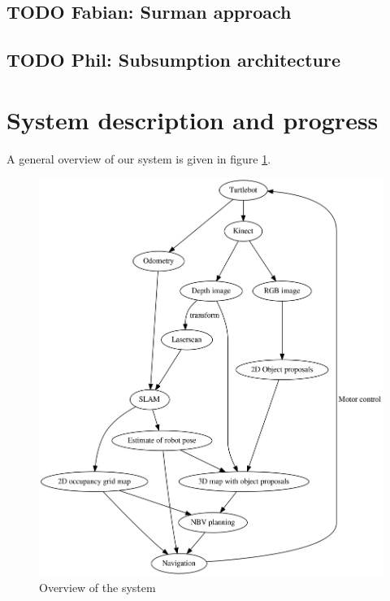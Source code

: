 \documentclass[a4paper,11pt,english]{article}
\begin{document}
\subsection{TODO Fabian: Surman approach}
\label{background:surman}
\subsection{TODO Phil: Subsumption architecture}
\label{background:subsumption}

\section{System description and progress}
\label{system}
A general overview of our system is given in figure \ref{fig:overview}.

\begin{figure}
	\begin{center}
		\includegraphics[width=1\linewidth]{dot/overview.png} 
		\caption{Overview of the system}
		\label{fig:overview}
	\end{center}
\end{figure}
\end{document}
